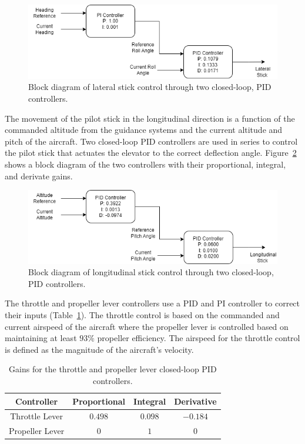 \begin{figure}[!ht]
    \centering
    \includegraphics[width=0.75\linewidth]{Figures/latstickcontrol.drawio.png}
    \caption{Block diagram of lateral stick control through two closed-loop, PID controllers.}\label{fig:latstickcontrol}
\end{figure}

The movement of the pilot stick in the longitudinal direction is a function of the commanded altitude from the guidance systems and the current altitude and pitch of the aircraft. Two closed-loop PID controllers are used in series to control the pilot stick that actuates the elevator to the correct deflection angle. Figure~\ref{fig:longstickcontrol} shows a block diagram of the two controllers with their proportional, integral, and derivate gains.

\begin{figure}[!ht]
    \centering
    \includegraphics[width=0.75\linewidth]{Figures/longstickcontrol.drawio.png}
    \caption{Block diagram of longitudinal stick control through two closed-loop, PID controllers.}\label{fig:longstickcontrol}
\end{figure}

The throttle and propeller lever controllers use a PID and PI controller to correct their inputs (Table~\ref{tbl:throttleProp}). The throttle control is based on the commanded and current airspeed of the aircraft where the propeller lever is controlled based on maintaining at least \(93\% \) propeller efficiency. The airspeed for the throttle control is defined as the magnitude of the aircraft's velocity.

\begin{table}[!ht]
    \caption{Gains for the throttle and propeller lever closed-loop PID controllers.}\label{tbl:throttleProp}
    \centering
    \begin{tabular}{cccc}
        \toprule
        Controller      & Proportional & Integral  & Derivative \\
        \midrule
        Throttle Lever  & \(0.498\)    & \(0.098\) & \(-0.184\) \\
        Propeller Lever & \(0\)        & \(1\)     & \(0\)      \\
        \bottomrule
    \end{tabular}
\end{table}

